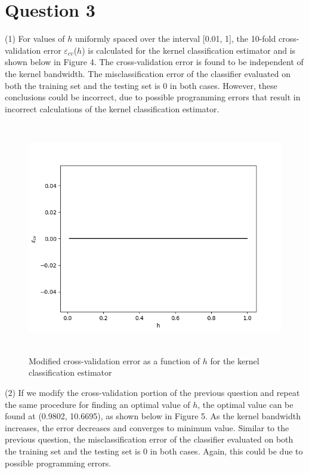 \section*{Question 3}
(1) For values of $h$ uniformly spaced over the interval [0.01, 1], the 10-fold cross-validation error $\varepsilon_{cv}$($h$) is calculated for the kernel classification estimator and is shown below in Figure 4. The cross-validation error is found to be independent of the kernel bandwidth. The misclassification error of the classifier evaluated on both the training set and the testing set is 0 in both cases. However, these conclusions could be incorrect, due to possible programming errors that result in incorrect calculations of the kernel classification estimator.
\begin{figure}[h!]
    \centering
    \includegraphics[height=4in]{Figure_10.png}
    \caption{Modified cross-validation error as a function of $h$ for the kernel classification estimator}
\end{figure}
\newpage
(2) If we modify the cross-validation portion of the previous question and repeat the same procedure for finding an optimal value of $h$, the optimal value can be found at (0.9802, 10.6695), as shown below in Figure 5. As the kernel bandwidth increases, the error decreases and converges to minimum value. Similar to the previous question, the misclassification error of the classifier evaluated on both the training set and the testing set is 0 in both cases. Again, this could be due to possible programming errors.

